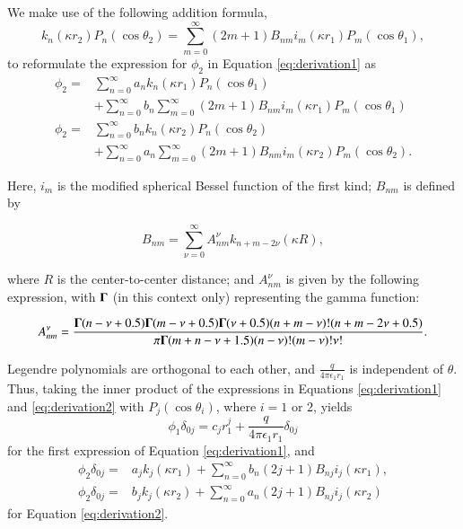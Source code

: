 We make use of the following addition formula, \cite{MarceljaMitchellNinhamSculley1977}
%
\begin{equation} \label{eq:addition_formula}
k_n(\kappa r_2) P_n(\cos \theta_2) = \sum_{m=0}^{\infty}(2m+1) B_{nm} i_m(\kappa r_1) P_m(\cos \theta_1),
\end{equation}
%
\noindent to reformulate the expression for $\phi_2$ in Equation \eqref{eq:derivation1} as 
%
\begin{align} \label{eq:derivation2}
\phi_2 =& \sum_{n=0}^{\infty} a_n k_n(\kappa r_1) P_n(\cos \theta_1) \nonumber \\
& + \sum_{n=0}^{\infty} b_n \sum_{m=0}^{\infty}(2m+1) B_{nm} i_m(\kappa r_1) P_m(\cos \theta_1) \nonumber \\ 
\phi_2 =& \sum_{n=0}^{\infty} b_n k_n(\kappa r_2) P_n(\cos \theta_2) \nonumber \\
& + \sum_{n=0}^{\infty} a_n \sum_{m=0}^{\infty}(2m+1) B_{nm} i_m(\kappa r_2) P_m(\cos \theta_2).
\end{align}

Here, $i_m$ is the modified spherical Bessel function of the first kind; $B_{nm}$ is defined by 

\begin{equation} \label{eq:Bnm}
B_{nm} = \sum_{\nu=0}^{\infty} A_{nm}^{\nu} k_{n+m-2\nu}(\kappa R),
\end{equation}

\noindent where $R$ is the center-to-center distance; and $A_{nm}^{\nu}$ is given by the following expression, with ${\bf \Gamma}$ (in this context only) representing the gamma function:

\begin{equation} \label{eq:Anm}
A_{nm}^{\nu} = \frac{{\bf \Gamma}(n-\nu+0.5){\bf \Gamma}(m-\nu+0.5){\bf \Gamma}(\nu+0.5)(n+m-\nu)!(n+m-2\nu+0.5)}{\pi {\bf \Gamma}(m+n-\nu+1.5)(n-\nu)!(m-\nu)!\nu!}.
\end{equation}



Legendre polynomials are orthogonal to each other, and $\frac{q}{4\pi\epsilon_1 r_1}$ is independent of $\theta$. Thus, taking the inner product of the expressions in Equations \eqref{eq:derivation1} and  \eqref{eq:derivation2} with $P_j(\cos \theta_i)$, where $i=1$ or $2$, yields
%
\begin{equation} \label{eq:derivation3}
\phi_1\delta_{0j} = c_j r_1^j + \frac{q}{4\pi\epsilon_1 r_1} \delta_{0j}  
\end{equation}
\noindent for the first expression of Equation \eqref{eq:derivation1}, and
%
\begin{align} \label{eq:derivation3.5}
\phi_2\delta_{0j} = &a_j k_j(\kappa r_1) + \sum_{n=0}^{\infty} b_n(2j+1)B_{nj} i_j(\kappa r_1),  \nonumber \\
\phi_2\delta_{0j} = &b_j k_j(\kappa r_2) + \sum_{n=0}^{\infty} a_n(2j+1)B_{nj} i_j(\kappa r_2)  
\end{align}
\noindent for Equation \eqref{eq:derivation2}.

